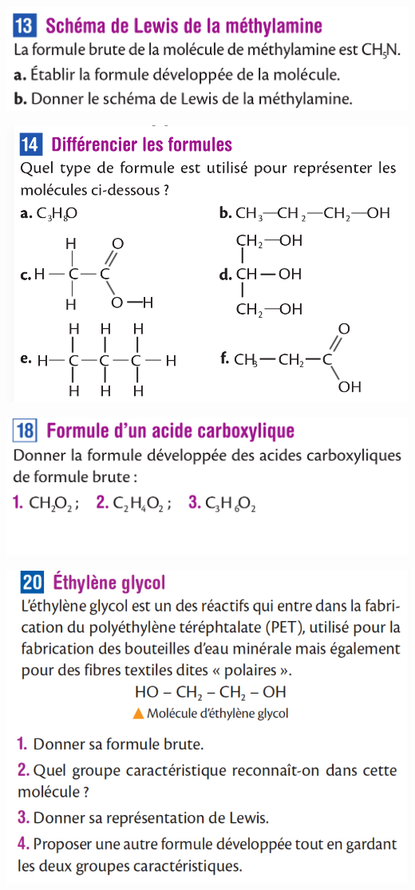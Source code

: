 \documentclass[10pt]{article}
\begin{document}
\begin{center}
\begin{minipage}[c]{0.45\textwidth}
		\includegraphics[scale=0.15]{assets/13.png}


		\includegraphics[scale=0.22]{assets/14.png}


		\includegraphics[scale=0.15]{assets/18.png}

		\includegraphics[scale=0.32]{assets/20.png}



\end{minipage}
\end{center}
\end{document}

